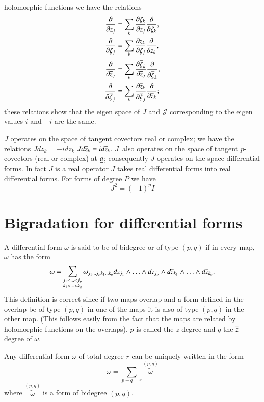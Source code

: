 holomorphic functions we have the relations
\begin{align*}
\frac{\partial}{\partial z_{j}} &= \sum_{k}\frac{\partial
  \zeta_{k}}{\partial z_{j}}\frac{\partial}{\partial \zeta_{k}},\\
\frac{\partial}{\partial \zeta_{j}} &= \sum_{k}\frac{\partial
  z_{k}}{\partial \zeta_{j}}\frac{\partial}{\partial z_{k}},\\
\frac{\partial}{\partial \overline{z}_{j}} &= \sum_{k}\frac{\partial
  \overline{\zeta}_{k}}{\partial \overline{z}_{j}}\frac{\partial}{\partial
  \overline{\zeta}_{k}},\\
\frac{\partial}{\partial \overline{\zeta}_{j}} &= \sum_{k}\frac{\partial
  \overline{z}_{k}}{\partial \overline{\zeta}_{j}}\frac{\partial}{\partial \overline{z}_{k}};
\end{align*}
these relations show that the eigen space of $J$ and $\mathscr{J}$
corresponding to the eigen values $i$ and $-i$ are the same.

$J$ operates on the space of tangent covectors real or complex; we
have the relations $Jdz_{k}=-idz_{k}$
$Jd\overline{z}_{k}=id\overline{z}_{k}$. $J$\pageoriginale\ also operates on the
space of tangent $p$-covectors (real or complex) at $\underline{a}$;
consequently $J$ operates on the space differential forms. In fact $J$
is a real operator \iec $J$ takes real differential forms into real
differential forms. For forms of degree $P$ we have
$$
J^{2}=(-1)^{p}I
$$

\section*{Bigradation for differential forms}

A differential form $\omega$ is said to be of bidegree or of type
$(p,q)$ if in every map, $\omega$ has the form
$$
\omega=\sum_{\substack{j_{1}<\ldots<j_{p}\\ k_{1}<\ldots<k_{q}}} 
\omega_{j_{1}\ldots j_{p}k_{1}\ldots 
  k_{q}}dz_{j_{1}}\wedge\ldots\wedge dz_{j_p} \wedge
d\overline{z}_{k_{1}}\wedge\ldots\wedge d\overline{z}_{k_{q}}.
$$
This definition is correct since if two maps overlap and a form
defined in the overlap be of type $(p,q)$ in one of the maps it is
also of type $(p,q)$ in the other map. (This follows easily from the
fact that the maps are related by holomorphic functions on the
overlaps). $p$ is called the $z$ degree and $q$ the $\overline{z}$ degree of
$\omega$.

Any differential form $\omega$ of total degree $r$ can be uniquely
written in the form
$$
\omega=\sum_{p+q=r}\overset{(p,q)}{\widetilde{\omega}}
$$
where $\overset{(p,q)}{\widetilde{\omega}}$ is a form of bidegree
$(p,q)$. 

